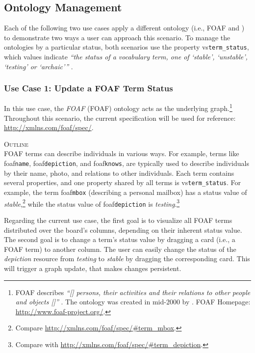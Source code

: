 \subsection{Ontology Management}\label{ssec:UseCase1-Ontology Management}

Each of the following two use cases apply a different ontology (i.e., \acrshort*{FOAF} and ) to demonstrate two ways a user can approach this scenario. To manage the ontologies by a particular status, both scenarios use the property \acrshort{vs}\texttt{term\_status}, which values indicate \textit{“the status of a vocabulary term, one of ‘stable’, ‘unstable’, ‘testing’ or ‘archaic’”} \parencite{Miller2014}.

\subsubsection{Use Case 1: Update a FOAF Term Status}

In this use case, the \textit{\acrlong*{FOAF}} (\acrshort*{FOAF}) ontology acts as the underlying graph.\footnote{\acrshort*{FOAF} describes \textit{``[\textellipsis{}] persons, their activities and their relations to other people and objects [\textellipsis{}]''} \parencite[9]{Gargouri2010}. The ontology was created in mid-2000 by \textcite{Miller2014}. \acrshort*{FOAF} Homepage: \url{http://www.foaf-project.org/}.} Throughout this scenario, the current specification will be used for reference: \url{http://xmlns.com/foaf/spec/}.

\vspace*{\baselineskip}

\noindent \textsc{Outline}\\
\noindent \acrshort*{FOAF} terms can describe individuals in various ways. For example, terms like \acrshort{foaf}\texttt{name}, \acrshort{foaf}\texttt{depiction}, and \acrshort{foaf}\texttt{knows}, are typically used to describe individuals by their name, photo, and relations to other individuals. Each term contains several properties, and one property shared by all terms is \acrshort{vs}\texttt{term\_status}. For example, the term \acrshort{foaf}\texttt{mbox} (describing a personal mailbox) has a status value of \textit{stable},\footnote{Compare \url{http://xmlns.com/foaf/spec/\#term\_mbox}.} while the status value of \acrshort{foaf}\texttt{depiction} is \textit{testing}.\footnote{Compare with \url{http://xmlns.com/foaf/spec/\#term\_depiction}.}

Regarding the current use case, the first goal is to visualize all \acrshort*{FOAF} terms distributed over the board’s columns, depending on their inherent status value. The second goal is to change a term’s status value by dragging a card (i.e., a \acrshort*{FOAF} term) to another column. The user can easily change the status of the \textit{depiction} resource from \textit{testing} to \textit{stable} by dragging the corresponding card. This will trigger a graph update, that makes changes persistent.

